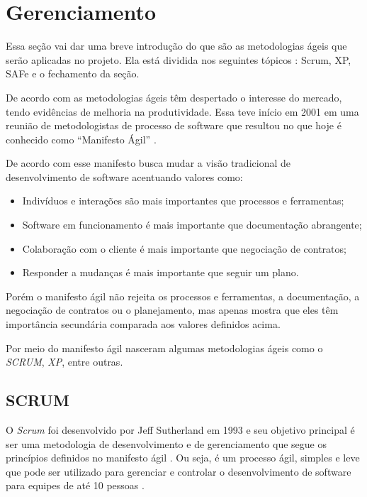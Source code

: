\section{Gerenciamento}

Essa seção vai dar uma breve introdução do que são as metodologias ágeis que serão aplicadas no projeto. Ela está dividida nos seguintes tópicos : Scrum, XP, SAFe e o fechamento da seção.

De acordo com \cite{lima} as metodologias ágeis têm despertado o interesse do mercado, tendo evidências de melhoria na produtividade. Essa teve início em 2001 em uma reunião de metodologistas de processo de software que resultou no que hoje é conhecido como “Manifesto Ágil” \cite{beck}.

De acordo com \cite{beck} esse manifesto busca mudar a visão tradicional de desenvolvimento de software acentuando valores como:

\begin{itemize}
  \item Indivíduos e interações são mais importantes que processos e ferramentas;
  \item Software em funcionamento é mais importante que documentação abrangente;
  \item Colaboração com o cliente é mais importante que negociação de contratos;
  \item Responder a mudanças é mais importante que seguir um plano.
\end{itemize}

Porém o manifesto ágil não rejeita os processos e ferramentas, a documentação, a negociação de contratos ou o planejamento, mas apenas mostra que eles têm importância secundária comparada aos valores definidos acima. \cite{lima}

Por meio do manifesto ágil nasceram algumas metodologias ágeis como o \textit{SCRUM}, \textit{XP}, entre outras.

\subsection{SCRUM}

O \textit{Scrum} foi desenvolvido por Jeff Sutherland em 1993 e seu objetivo principal é ser uma metodologia de desenvolvimento e de gerenciamento que segue os princípios definidos no manifesto ágil \cite{lima}. Ou seja, é um processo ágil, simples e leve que pode ser utilizado para gerenciar e controlar o desenvolvimento de software para equipes de até 10 pessoas \cite{diniz}.

